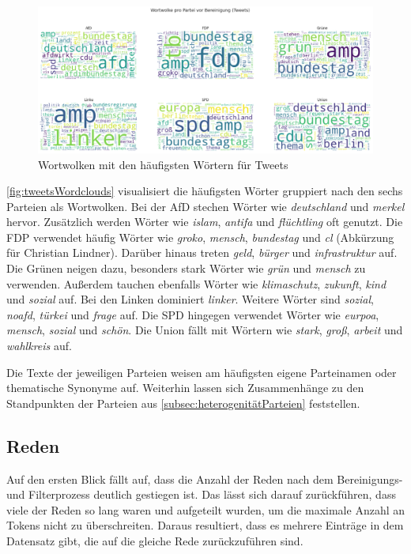 \begin{figure}[H]
    \centering
    \includegraphics[width=\linewidth]{data/images/tweets/wortwolke_pro_partei_vor_bereinigung.png}
    \caption{Wortwolken mit den häufigsten Wörtern für Tweets} \label{fig:tweetsWordclouds}
\end{figure}

\autoref{fig:tweetsWordclouds} visualisiert die häufigsten Wörter gruppiert nach den sechs Parteien als Wortwolken. Bei der \ac{AfD} stechen Wörter wie \textit{deutschland} und \textit{merkel} hervor. Zusätzlich werden Wörter wie \textit{islam}, \textit{antifa} und \textit{flüchtling} oft genutzt. Die \ac{FDP} verwendet häufig Wörter wie \textit{groko}, \textit{mensch}, \textit{bundestag} und \textit{cl} (Abkürzung für Christian Lindner). Darüber hinaus treten \textit{geld}, \textit{bürger} und \textit{infrastruktur} auf. Die Grünen neigen dazu, besonders stark Wörter wie \textit{grün} und \textit{mensch} zu verwenden. Außerdem tauchen ebenfalls Wörter wie \textit{klimaschutz}, \textit{zukunft}, \textit{kind} und \textit{sozial} auf. Bei den Linken dominiert \textit{linker}. Weitere Wörter sind \textit{sozial}, \textit{noafd}, \textit{türkei} und \textit{frage} auf. Die \ac{SPD} hingegen verwendet Wörter wie \textit{eurpoa}, \textit{mensch}, \textit{sozial} und \textit{schön}. Die Union fällt mit Wörtern wie \textit{stark}, \textit{groß}, \textit{arbeit} und \textit{wahlkreis} auf.

Die Texte der jeweiligen Parteien weisen am häufigsten eigene Parteinamen oder thematische Synonyme auf. Weiterhin lassen sich Zusammenhänge zu den Standpunkten der Parteien aus \autoref{subsec:heterogenitätParteien} feststellen.

\subsection*{Reden}

Auf den ersten Blick fällt auf, dass die Anzahl der Reden nach dem Bereinigungs- und Filterprozess deutlich gestiegen ist. Das lässt sich darauf zurückführen, dass viele der Reden so lang waren und aufgeteilt wurden, um die maximale Anzahl an Tokens nicht zu überschreiten. Daraus resultiert, dass es mehrere Einträge in dem Datensatz gibt, die auf die gleiche Rede zurückzuführen sind.

